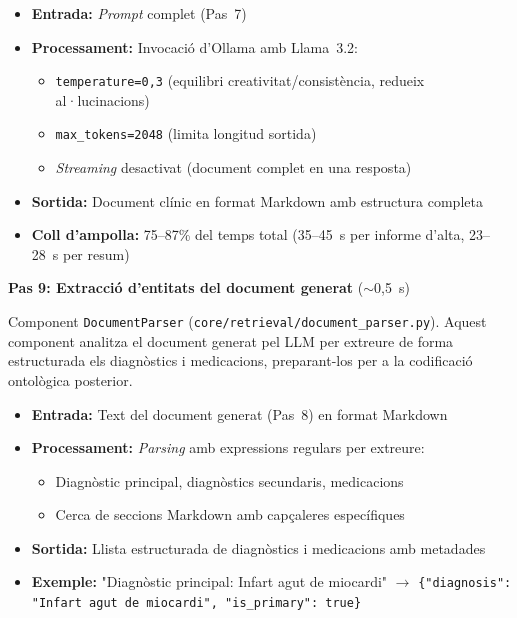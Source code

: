 \documentclass[CAT]{TFUOC}%
\begin{document}
\begin{itemize}
    \setlength{\itemsep}{0.3em}
    \item \textbf{Entrada:} \textit{Prompt} complet (Pas~7)
    \item \textbf{Processament:} Invocació d'Ollama amb Llama~3.2:
    \begin{itemize}
        \item \texttt{temperature=0,3} (equilibri creativitat/consistència, redueix al·lucinacions)
        \item \texttt{max\_tokens=2048} (limita longitud sortida)
        \item \textit{Streaming} desactivat (document complet en una resposta)
    \end{itemize}
    \item \textbf{Sortida:} Document clínic en format Markdown amb estructura completa
    \item \textbf{Coll d'ampolla:} 75--87\% del temps total (35--45~s per informe d'alta, 23--28~s per resum)
\end{itemize}

\vspace{0.4em}

\textbf{Pas 9: Extracció d'entitats del document generat} ($\sim$0,5~s)

Component \texttt{DocumentParser} (\texttt{core/retrieval/document\_parser.py}). Aquest component analitza el document generat pel LLM per extreure de forma estructurada els diagnòstics i medicacions, preparant-los per a la codificació ontològica posterior.

\begin{itemize}
    \setlength{\itemsep}{0.3em}
    \item \textbf{Entrada:} Text del document generat (Pas~8) en format Markdown
    \item \textbf{Processament:} \textit{Parsing} amb expressions regulars per extreure:
    \begin{itemize}
        \item Diagnòstic principal, diagnòstics secundaris, medicacions
        \item Cerca de seccions Markdown amb capçaleres específiques
    \end{itemize}
    \item \textbf{Sortida:} Llista estructurada de diagnòstics i medicacions amb metadades
    \item \textbf{Exemple:} "Diagnòstic principal: Infart agut de miocardi" $\rightarrow$ \texttt{\{"diagnosis": "Infart agut de miocardi", "is\_primary": true\}}
\end{itemize}
\end{document}
